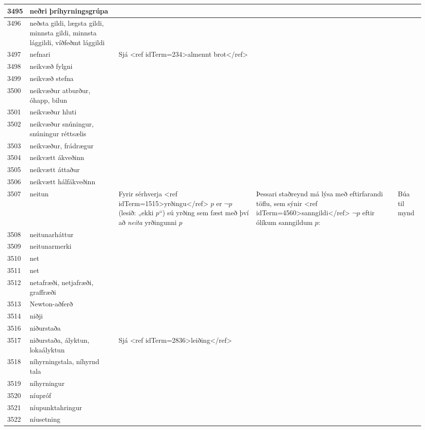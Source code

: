 \begin{longtable}{p{}|p{}|p{}|p{}|p{}}
\hline
3495 & neðri þríhyrningsgrúpa &  &  &  \\
\hline
3496 & neðsta gildi, lægsta gildi, minnsta gildi, minnsta lággildi, víðfeðmt lággildi &  &  &  \\
\hline
3497 & nefnari & Sjá <ref idTerm=234>almennt brot</ref> &  &  \\
\hline
3498 & neikvæð fylgni &  &  &  \\
\hline
3499 & neikvæð stefna &  &  &  \\
\hline
3500 & neikvæður atburður, óhapp, bilun &  &  &  \\
\hline
3501 & neikvæður hluti &  &  &  \\
\hline
3502 & neikvæður snúningur, snúningur réttsælis &  &  &  \\
\hline
3503 & neikvæður, frádrægur &  &  &  \\
\hline
3504 & neikvætt ákveðinn &  &  &  \\
\hline
3505 & neikvætt áttaður &  &  &  \\
\hline
3506 & neikvætt hálfákveðinn &  &  &  \\
\hline
3507 & neitun & Fyrir sérhverja <ref idTerm=1515>yrðingu</ref> $p$ er $\neg p$ (lesið: „ekki $p$“) sú yrðing sem fæst með því að \textit{neita} yrðingunni $p$ & Þessari staðreynd má lýsa með eftirfarandi töflu, sem sýnir <ref idTerm=4560>sanngildi</ref> $\neg p$ eftir ólíkum sanngildum $p$: & Búa til mynd  \\
\hline
3508 & neitunarháttur &  &  &  \\
\hline
3509 & neitunarmerki &  &  &  \\
\hline
3510 & net &  &  &  \\
\hline
3511 & net &  &  &  \\
\hline
3512 & netafræði, netjafræði, graffræði &  &  &  \\
\hline
3513 & Newton-aðferð &  &  &  \\
\hline
3514 & niðji &  &  &  \\
\hline
3516 & niðurstaða &  &  &  \\
\hline
3517 & niðurstaða, ályktun, lokaályktun & Sjá <ref idTerm=2836>leiðing</ref>  &  &  \\
\hline
3518 & níhyrningstala, níhyrnd tala &  &  &  \\
\hline
3519 & níhyrningur &  &  &  \\
\hline
3520 & níupróf &  &  &  \\
\hline
3521 & níupunktahringur &  &  &  \\
\hline
3522 & níusetning &  &  &  \\

\end{longtable}
